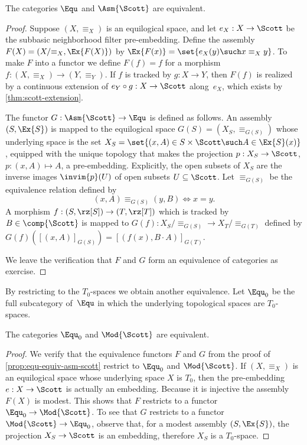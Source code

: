 \begin{proposition}
  \label{prop:equ-equiv-asm-scott}%
  The categories $\Equ$ and $\Asm{\Scott}$ are equivalent.
\end{proposition}

\begin{proof}
  Suppose $(X, {\equiv_X})$ is an equilogical space, and let $e_X : X
  \to \Scott$ be the subbasic neighborhood filter pre-embedding.
  Define the assembly $F(X) = (X/{\equiv_X}, \Ex{F(X)})$ by
  $\Ex{F(x)} = \set{e_X(y) \such x \equiv_X y}$. To make $F$ into a
  functor we define $F(f) = f$ for a morphism $f : (X, {\equiv_X}) \to
  (Y, {\equiv_Y})$. If $f$ is tracked by $g : X \to Y$, then $F(f)$ is
  realized by a continuous extension of $e_Y \circ g : X \to \Scott$
  along~$e_X$, which exists by \cref{thm:scott-extension}.

  The functor $G : \Asm{\Scott} \to \Equ$ is defined as follows. An
  assembly $(S, \Ex{S})$ is mapped to the equilogical space $G(S) =
  (X_S, \equiv_{G(S)})$ whose underlying space is the set $X_S =
  \set{(x,A) \in S \times \Scott \such A \in \Ex{S}(x)}$, equipped with
  the unique topology that makes the projection $p : X_S \to \Scott$,
  $p : (x,A) \mapsto A$, a pre-embedding. Explicitly, the open subsets
  of $X_S$ are the inverse images $\invim{p}(U)$ of open subsets $U
  \subseteq \Scott$. Let $\equiv_{G(S)}$ be the equivalence relation
  defined by
  \begin{equation*}
    (x,A) \equiv_{G(S)} (y,B) \iff x = y.
  \end{equation*}
  A morphism $f : (S, {\rz[S]}) \to (T, {\rz[T]})$ which is tracked by
  $B \in \comp{\Scott}$ is mapped to $G(f) : X_S/{\equiv_{G(S)}} \to
  X_T/{\equiv_{G(T)}}$ defined by $G(f)([(x,A)]_{G(S)}) = [(f(x), B
  \cdot A)]_{G(T)}$.

  We leave the verification that $F$ and $G$ form an equivalence of
  categories as exercise.
\end{proof}

By restricting to the $T_0$-spaces we obtain another equivalence. Let
$\Equ_0$ be the full subcategory of~$\Equ$ in which the underlying
topological spaces are $T_0$-spaces.


\begin{proposition}
  \label{prop:equ0-equiv-mod-scott}
  The categories $\Equ_0$ and $\Mod{\Scott}$ are equivalent.
\end{proposition}

\begin{proof}
  We verify that the equivalence functors $F$ and $G$ from the proof
  of \cref{prop:equ-equiv-asm-scott} restrict to $\Equ_0$
  and $\Mod{\Scott}$. If $(X, {\equiv_X})$ is an equilogical space
  whose underlying space $X$ is $T_0$, then the pre-embedding $e : X
  \to \Scott$ is actually an embedding. Because it is injective the
  assembly $F(X)$ is modest. This shows that $F$ restricts to a
  functor $\Equ_0 \to \Mod{\Scott}$.
  To see that $G$ restricts to a functor $\Mod{\Scott} \to \Equ_0$,
  observe that, for a modest assembly $(S, \Ex{S})$, the projection
  $X_S \to \Scott$ is an embedding, therefore $X_S$ is a $T_0$-space.
\end{proof}


